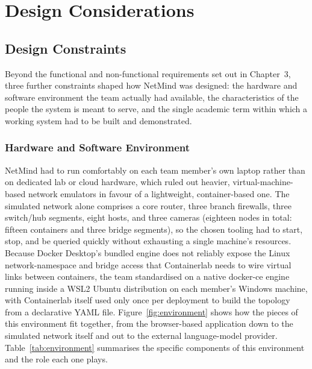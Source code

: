 \chapter{Design Considerations}

\section{Design Constraints}

Beyond the functional and non-functional requirements set out in Chapter~3,
three further constraints shaped how NetMind was designed: the hardware and
software environment the team actually had available, the characteristics of
the people the system is meant to serve, and the single academic term within
which a working system had to be built and demonstrated.

\subsection{Hardware and Software Environment}

NetMind had to run comfortably on each team member's own laptop rather than
on dedicated lab or cloud hardware, which ruled out heavier,
virtual-machine-based network emulators in favour of a lightweight,
container-based one. The simulated network alone comprises a core router,
three branch firewalls, three switch/hub segments, eight hosts, and three
cameras (eighteen nodes in total: fifteen containers and three bridge
segments), so the chosen tooling had to start, stop, and be queried quickly
without exhausting a single machine's resources. Because Docker Desktop's
bundled engine does not reliably expose the Linux network-namespace and
bridge access that Containerlab needs to wire virtual links between
containers, the team standardised on a native docker-ce engine running inside
a WSL2 Ubuntu distribution on each member's Windows machine, with
Containerlab itself used only once per deployment to build the topology from
a declarative YAML file. Figure~\ref{fig:environment} shows how the pieces of
this environment fit together, from the browser-based application down to
the simulated network itself and out to the external language-model
provider. Table~\ref{tab:environment} summarises the specific components of
this environment and the role each one plays.

